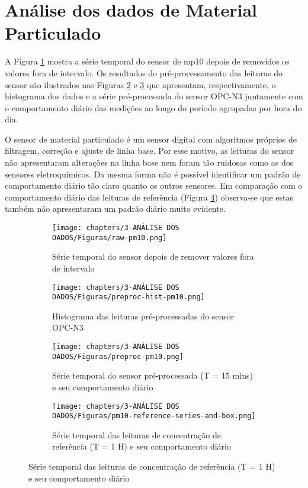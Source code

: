 \section{Análise dos dados de Material Particulado}

A Figura \ref{fig:data-pm10-raw} mostra a série temporal do sensor de \acrshort{mp10} depois de removidos os valores fora de intervalo. Os resultados do pré-processamento das leituras do sensor são ilustrados nas Figuras \ref{fig:data-pm10-preproc-hist} e \ref{fig:data-pm10-preproc-15} que apresentam, respectivamente, o histograma dos dados e a série pré-processada do sensor OPC-N3 juntamente com o comportamento diário das medições ao longo do período agrupadas por hora do dia.

O sensor de material particulado é um sensor digital com algoritmos próprios de filtragem, correção e ajuste de linha base. Por esse motivo, as leituras do sensor não apresentaram alterações na linha base nem foram tão ruidosas como as dos sensores eletroquímicos. Da mesma forma não é possível identificar um padrão de comportamento diário tão claro quanto os outros sensores. Em comparação com o comportamento diário das leituras de referência (Figura \ref{fig:data-pm10-reference}) observa-se que estas também não apresentaram um padrão diário muito evidente.

\begin{figure}[h!]
    \centering
    \caption{Série temporal das leituras do sensor OPC-N3}
    \begin{subfigure}{0.48\textwidth}
        \texttt{[image: chapters/3-ANÁLISE DOS DADOS/Figuras/raw-pm10.png]}
        \caption{Série temporal do sensor depois de remover valores fora de intervalo}
        \label{fig:data-pm10-raw}
    \end{subfigure}
    \hfill
    \begin{subfigure}{0.5\textwidth}
        \texttt{[image: chapters/3-ANÁLISE DOS DADOS/Figuras/preproc-hist-pm10.png]}
        \caption{Histograma das leituras pré-processadas do sensor OPC-N3}
        \label{fig:data-pm10-preproc-hist}
    \end{subfigure}
    \hfill
    \begin{subfigure}{0.99\textwidth}
        \texttt{[image: chapters/3-ANÁLISE DOS DADOS/Figuras/preproc-pm10.png]}
        \caption{Série temporal do sensor pré-processada (T = 15 mins) e seu comportamento diário}
        \label{fig:data-pm10-preproc-15}
    \end{subfigure}
    \hfill
    \begin{subfigure}{0.99\textwidth}
        \texttt{[image: chapters/3-ANÁLISE DOS DADOS/Figuras/pm10-reference-series-and-box.png]}
        \caption{Série temporal das leituras de concentração de referência (T = 1 H) e seu comportamento diário}
        \label{fig:data-pm10-reference}
    \end{subfigure}
    \hfill
    \label{fig:data-pm10}
\end{figure}

